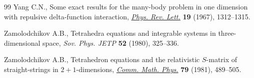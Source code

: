 \documentclass[pdftex]{sigma}
\numberwithin{equation}{section}
\theoremstyle{definition}
\begin{document}
\begin{thebibliography}{99}
Yang C.N., Some exact results for the many-body problem in one dimension with
 repulsive delta-function interaction,
 \href{https://doi.org/10.1103/PhysRevLett.19.1312}{\textit{Phys. Rev. Lett.}}
 \textbf{19} (1967), 1312--1315.

Zamolodchikov A.B., Tetrahedra equations and integrable systems in
 three-dimensional space, \textit{Sov. Phys. JETP} \textbf{52} (1980),
 325--336.

Zamolodchikov A.B., Tetrahedron equations and the relativistic {$S$}-matrix of
 straight-strings in {$2+1$}-dimensions,
 \href{https://doi.org/10.1007/BF01209309}{\textit{Comm. Math. Phys.}}
 \textbf{79} (1981), 489--505.

\end{thebibliography}\LastPageEnding
\end{document}
